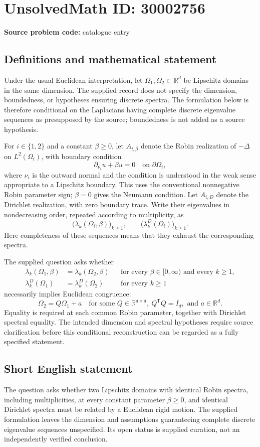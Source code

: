 \documentclass[11pt]{article}
\newcommand{\R}{\mathbb{R}}
\begin{document}
\section*{UnsolvedMath ID: 30002756}
\textbf{Source problem code:} catalogue entry
\subsection{Definitions and mathematical statement}
Under the usual Euclidean interpretation, let \(\Omega_1,\Omega_2\subset\R^d\) be Lipschitz domains in the same dimension. The supplied record does not specify the dimension, boundedness, or hypotheses ensuring discrete spectra. The formulation below is therefore conditional on the Laplacians having complete discrete eigenvalue sequences as presupposed by the source; boundedness is not added as a source hypothesis.

For \(i\in\{1,2\}\) and a constant \(\beta\geq0\), let \(A_{i,\beta}\) denote the Robin realization of \(-\Delta\) on \(L^2(\Omega_i)\), with boundary condition
\[
\partial_{\nu_i}u+\beta u=0\quad\text{on }\partial\Omega_i,
\]
where \(\nu_i\) is the outward normal and the condition is understood in the weak sense appropriate to a Lipschitz boundary. This uses the conventional nonnegative Robin parameter sign; \(\beta=0\) gives the Neumann condition. Let \(A_{i,D}\) denote the Dirichlet realization, with zero boundary trace. Write their eigenvalues in nondecreasing order, repeated according to multiplicity, as
\[
\bigl(\lambda_k(\Omega_i,\beta)\bigr)_{k\geq1},\qquad
\bigl(\lambda_k^D(\Omega_i)\bigr)_{k\geq1}.
\]
Here completeness of these sequences means that they exhaust the corresponding spectra.

The supplied question asks whether
\[
\begin{aligned}
\lambda_k(\Omega_1,\beta)&=\lambda_k(\Omega_2,\beta)
&&\text{for every }\beta\in[0,\infty)\text{ and every }k\geq1,\\
\lambda_k^D(\Omega_1)&=\lambda_k^D(\Omega_2)
&&\text{for every }k\geq1
\end{aligned}
\]
necessarily implies Euclidean congruence:
\[
\Omega_2=Q\Omega_1+a
\quad\text{for some }Q\in\R^{d\times d},\ Q^{\mathsf T}Q=I_d,
\text{ and }a\in\R^d.
\]
Equality is required at each common Robin parameter, together with Dirichlet spectral equality. The intended dimension and spectral hypotheses require source clarification before this conditional reconstruction can be regarded as a fully specified statement.
\subsection{Short English statement}
The question asks whether two Lipschitz domains with identical Robin spectra, including multiplicities, at every constant parameter \(\beta\geq0\), and identical Dirichlet spectra must be related by a Euclidean rigid motion. The supplied formulation leaves the dimension and assumptions guaranteeing complete discrete eigenvalue sequences unspecified. Its open status is supplied curation, not an independently verified conclusion.
\end{document}
